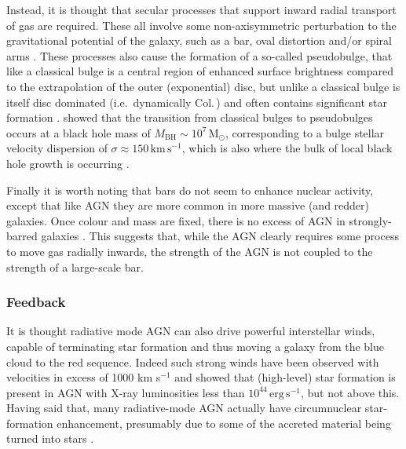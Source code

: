 			Instead, it is thought that secular processes that support inward radial transport of gas are required. These all involve some non-axisymmetric perturbation to the gravitational potential of the galaxy, such as a bar, oval distortion and/or spiral arms \citep[e.g.][]{Kormendy2004, Athanassoula2008, Sellwood2014}. These processes also cause the formation of a so-called pseudobulge, that like a classical bulge is a central region of enhanced surface brightness compared to the extrapolation of the outer (exponential) disc, but unlike a classical bulge is itself disc dominated (i.e.\ dynamically Col.\,) and often contains significant star formation \citep[e.g.][]{Gadotti2009}. \citet{Kormendy2013a} showed that the transition from classical bulges to pseudobulges occurs at a black hole mass of $M_\text{BH} \sim 10^7\,\mathrm{M_\odot}$, corresponding to a bulge stellar velocity dispersion of $\sigma \approx 150 \, \mathrm{km \, s^{-1}}$, which is also where the bulk of local black hole growth is occurring \citep[e.g.][]{Heckman2004, Kauffmann2009}. 

			Finally it is worth noting that bars do not seem to enhance nuclear activity, except that like AGN they are more common in more massive (and redder) galaxies. Once colour and mass are fixed, there is no excess of AGN in strongly-barred galaxies \citep[e.g.][]{Lee2012, Cisternas2013}. This suggests that, while the AGN clearly requires some process to move gas radially inwards, the strength of the AGN is not coupled to the strength of a large-scale bar. 


		\subsubsection{Feedback}
			\label{subsubsec:RadiativeFeedback}
			It is thought radiative mode AGN can also drive powerful interstellar winds, capable of terminating star formation and thus moving a galaxy from the blue cloud to the red sequence. Indeed such strong winds have been observed with velocities in excess of 1000 km s$^{-1}$ \citep{Fischer2010, Feruglio2010, Rupke2011} and \citet{Page2012} showed that (high-level) star formation is present in AGN with X-ray luminosities less than $10^{44} \, \mathrm{erg \, s^{-1}}$, but not above this. Having said that, many radiative-mode AGN actually have circumnuclear star-formation enhancement, presumably due to some of the accreted material being turned into stars \citep[e.g.][]{Santini2012}. 

